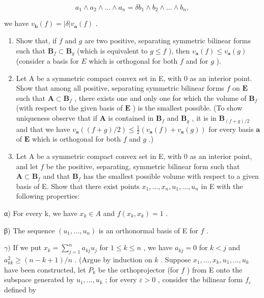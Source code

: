 \[
a _ {1} \wedge a _ {2} \wedge \dots \wedge a _ {n} = \delta b _ {1} \wedge b _ {2} \wedge \dots \wedge b _ {n},
\]

we have \(v_{\mathbf{b}}(f) = |\delta| v_{\mathbf{a}}(f)\) .

\begin{enumerate}
\def\labelenumi{\alph{enumi})}
\item
  Show that, if \(f\) and \(g\) are two positive, separating symmetric bilinear forms such that \(\mathbf{B}_f \subset \mathbf{B}_g\) (which is equivalent to \(g \leqslant f\) ), then \(v_{\mathbf{a}}(f) \leqslant v_{\mathbf{a}}(g)\) (consider a basis for \(E\) which is orthogonal for both \(f\) and for \(g\) ).
\item
  Let A be a symmetric compact convex set in E, with 0 as an interior point. Show that among all positive, separating symmetric bilinear forms \(f\) on \(\mathbf{E}\) such that \(\mathbf{A} \subset \mathbf{B}_f\) , there exists one and only one for which the volume of \(\mathbf{B}_f\) (with respect to the given basis of \(\mathbf{E}\) ) is the smallest possible. (To show uniqueness observe that if \(\mathbf{A}\) is contained in \(\mathbf{B}_f\) and \(\mathbf{B}_g\) , it is in \(\mathbf{B}_{(f + g)/2}\) and that we have \(v_{\mathbf{a}}((f + g)/2) \leqslant \frac{1}{2}(v_{\mathbf{a}}(f) + v_{\mathbf{a}}(g))\) for every basis \(\mathbf{a}\) of \(\mathbf{E}\) which is orthogonal for both \(f\) and \(g\) .)
\item
  Let A be a symmetric compact convex set in E, with 0 as an interior point, and let \(f\) be the positive, separating, symmetric bilinear form such that \(\mathbf{A} \subset \mathbf{B}_f\) and that \(\mathbf{B}_f\) has the smallest possible volume with respect to a given basis of E. Show that there exist points \(x_1, \ldots, x_n, u_1, \ldots, u_n\) in E with the following properties:
\end{enumerate}

α) For every k, we have \(x_{k} \in A\) and \(f(x_{k}, x_{k}) = 1\) .

β) The sequence \((u_{1},\dots,u_{n})\) is an orthonormal basis of E for \(f\) .

\(\gamma)\) If we put \(x_{k} = \sum_{j=1}^{n} a_{kj} u_{j}\) for \(1 \leqslant k \leqslant n\) , we have \(a_{kj} = 0\) for \(k < j\) and \(a_{kk}^{2} \geqslant (n - k + 1)/n\) . (Argue by induction on \(k\) . Suppose \(x_{1}, \ldots, x_{k}, u_{1}, \ldots, u_{k}\) have been constructed, let \(P_{k}\) be the orthoprojector (for \(f\) ) from E onto the subspace generated by \(u_{1}, \ldots, u_{k}\) ; for every \(\varepsilon > 0\) , consider the bilinear form \(f_{\varepsilon}\) defined by

